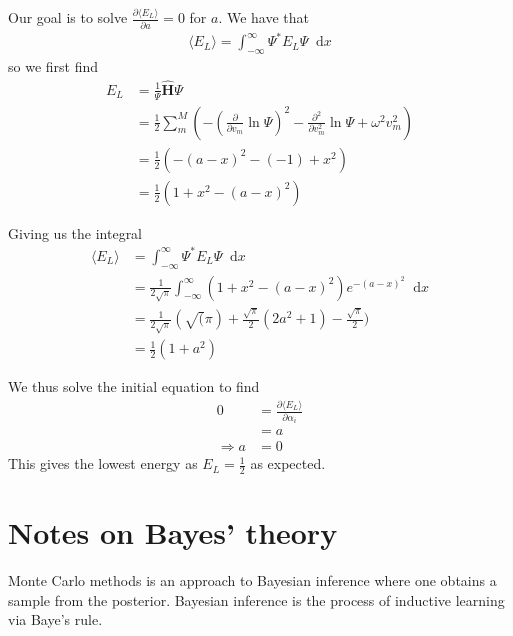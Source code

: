 \documentclass[norsk,a4paper,11pt]{article}
\newcommand*\diff{\mathop{}\!\mathrm{d}}
\begin{document}
Our goal is to solve $\frac{\partial \langle E_L \rangle}{\partial a} = 0$ for $a$.
We have that
\begin{align}
	\langle E_L \rangle = \int_{-\infty}^\infty \Psi^* E_L \Psi \diff x
\end{align}
so we first find
\begin{align}
	E_L &= \frac{1}{\Psi} \hat{\mathbf{H}} \Psi \\
	&= \frac{1}{2} \sum_m^M (-(\frac{\partial}{\partial v_m} \ln\Psi)^2 -\frac{\partial^2}{\partial v_m^2} \ln\Psi + \omega^2 v_m^2) \\
	&= \frac{1}{2}(-(a-x)^2 -(-1) + x^2) \\
	&= \frac{1}{2}(1 + x^2 -(a-x)^2)
\end{align}

Giving us the integral
\begin{align}
	\langle E_L \rangle &= \int_{-\infty}^\infty \Psi^* E_L \Psi \diff x \\
	&= \frac{1}{2\sqrt{\pi}} \int_{-\infty}^\infty
	(1 + x^2 - (a-x)^2)e^{-(a-x)^2} \diff x \\
	&= \frac{1}{2\sqrt{\pi}} (\sqrt(\pi) + \frac{\sqrt{\pi}}{2}(2a^2 + 1) - \frac{\sqrt{\pi}}{2}) \\
	&= \frac{1}{2}(1 + a^2)
\end{align}

We thus solve the initial equation to find
\begin{align}
	0 &= \frac{\partial \langle E_L \rangle}{\partial \alpha_i} \\
	&= a \\
	\Rightarrow a &=0
\end{align}
This gives the lowest energy as $E_L = \frac{1}{2}$ as expected.


\section{Notes on Bayes' theory}
Monte Carlo methods is an approach to Bayesian inference where one obtains a sample from the posterior.
Bayesian inference is the process of inductive learning via Baye's rule.
\end{document}
